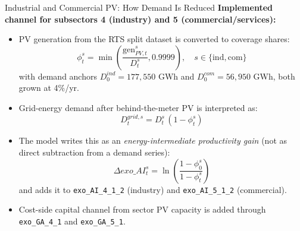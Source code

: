\documentclass[aspectratio=169]{beamer}
\begin{document}
\begin{frame}{Industrial and Commercial PV: How Demand Is Reduced}
\small
\textbf{Implemented channel for subsectors 4 (industry) and 5 (commercial/services):}
\begin{itemize}
  \item PV generation from the RTS split dataset is converted to coverage shares:
  \[
  \phi_t^{s}=\min\!\left(\frac{\text{gen}^{s}_{PV,t}}{D_t^{s}},0.9999\right),\quad s\in\{\text{ind},\text{com}\}
  \]
  with demand anchors $D_0^{ind}=177{,}550$ GWh and $D_0^{com}=56{,}950$ GWh, both grown at 4\%/yr.
  \item Grid-energy demand after behind-the-meter PV is interpreted as:
  \[
  D^{grid,s}_t=D_t^s\,(1-\phi_t^s)
  \]
  \item The model writes this as an \emph{energy-intermediate productivity gain} (not as direct subtraction from a demand series):
  \[
  \Delta exo\_AI^s_t = \ln\!\left(\frac{1-\phi_0^s}{1-\phi_t^s}\right)
  \]
  and adds it to \texttt{exo\_AI\_4\_1\_2} (industry) and \texttt{exo\_AI\_5\_1\_2} (commercial).
  \item Cost-side capital channel from sector PV capacity is added through \texttt{exo\_GA\_4\_1} and \texttt{exo\_GA\_5\_1}.
\end{itemize}
\end{frame}
\end{document}
